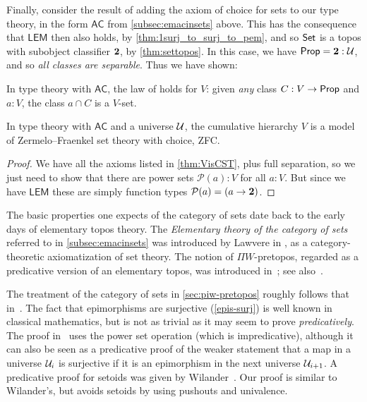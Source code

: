 Finally, consider the result of adding the axiom of choice for sets to our type theory, in the form  $\mathsf{AC}$ from \autoref{subsec:emacinsets} above.  This has the consequence that $\mathsf{LEM}$ then also holds, by \autoref{thm:1surj_to_surj_to_pem}, and so $\mathsf{Set}$ is a topos with subobject classifier $\mathbf{2}$, by \autoref{thm:settopos}.  In this case, we have $\mathsf{Prop} = \mathbf{2}:\mathcal{U}$, and so \emph{all classes are separable}.  Thus we have shown:

\begin{lem}\label{lem:fullsep}
In type theory with $\mathsf{AC}$, the law of  holds for $V$: given \emph{any} class $C : V \to \mathsf{Prop}$ and $a : V$, the class $a \cap C$ is a $V$-set.
\end{lem}

\begin{thm}\label{thm:zfc}
In type theory with $\mathsf{AC}$ and a universe $\mathcal{U}$, the cumulative hierarchy $V$ is a model of Zermelo--Fraenkel set theory with choice, ZFC.
\end{thm}

\begin{proof}
We have all the axioms listed in \autoref{thm:VisCST}, plus full separation, so we just need to show that there are power sets $\mathcal{P}(a):V$ for all $a:V$.  But since we have $\mathsf{LEM}$ these are simply function types $\mathcal{P}(a) = (a\to\mathbf{2})$.
\end{proof}

\sectionNotes

The basic properties one expects of the category of sets date back to the early days of elementary topos theory.
The \emph{Elementary theory of the category of sets} referred to in \autoref{subsec:emacinsets} was introduced by Lawvere in
\cite{lawvere:etcs-long}, as a category-theoretic axiomatization of set theory.
The notion of $\Pi W$-pretopos, regarded as a predicative version of an elementary topos, was introduced in~\cite{MoerdijkPalmgren2002}; see also~\cite{palmgren:cetcs}.

The treatment of the category of sets in \autoref{sec:piw-pretopos} roughly follows that in~\cite{RijkeSpitters}.
The fact that epimorphisms are surjective (\autoref{epis-surj}) is well known in classical mathematics, but is not as trivial as it may seem to prove \emph{predicatively}.
The proof in~\cite{Mines/R/R:1988} uses the power set operation (which is impredicative), although it can also be seen as a predicative proof of the weaker statement that a map in a universe $\mathcal{U}_i$ is surjective if it is an epimorphism in the next universe $\mathcal{U}_{i+1}$.
A predicative proof for setoids was given by Wilander~\cite{Wilander2010}. 
Our proof is similar to Wilander's, but avoids setoids by using pushouts and univalence.

